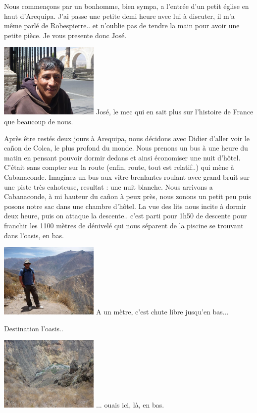 \begin{multicols}{2}
Nous commençons par un bonhomme, bien sympa, a l'entrée d'un petit église en haut d'Arequipa. J'ai passe une petite demi heure avec lui à discuter, il m'a même parlé de Robespierre.. et n'oublie pas de tendre la main pour avoir une petite pièce. Je vous presente donc José.

\hspace*{-0.65cm}
\includegraphics[width=4.8cm]{articles/Arequipa-colca-titicaca/1256606933jPp4.jpg}
José, le mec qui en sait plus sur l'histoire de France que beaucoup de nous.

Après être restés deux jours à Arequipa, nous décidons avec Didier d'aller voir le cañon de Colca, le plus profond du monde. Nous prenons un bus à une heure du matin en pensant pouvoir dormir dedans et ainsi économiser une nuit d'hôtel. C'était sans compter sur la route (enfin, route, tout est relatif..) qui mène à Cabanaconde. Imaginez un bus aux vitre brenlantes roulant avec grand bruit sur une piste très cahoteuse, resultat : une nuit blanche. Nous arrivons a Cabanaconde, à mi hauteur du cañon à peux près, nous zonons un petit peu puis posons notre sac dans une chambre d'hôtel. La vue des lits nous incite à dormir deux heure, puis on attaque la descente.. c'est parti pour 1h50 de descente pour franchir les 1100 mètres de dénivelé qui nous séparent de la piscine se trouvant dans l'oasis, en bas.

\hspace*{-0.65cm}
\includegraphics[width=4.8cm]{articles/Arequipa-colca-titicaca/12566073542gHb.jpg}
A un mètre, c'est chute libre jusqu'en bas...

Destination l'oasis..

\hspace*{-0.65cm}
\includegraphics[width=4.8cm]{articles/Arequipa-colca-titicaca/1256607360xfpT.jpg}
... ouais ici, là, en bas.


\end{multicols}
